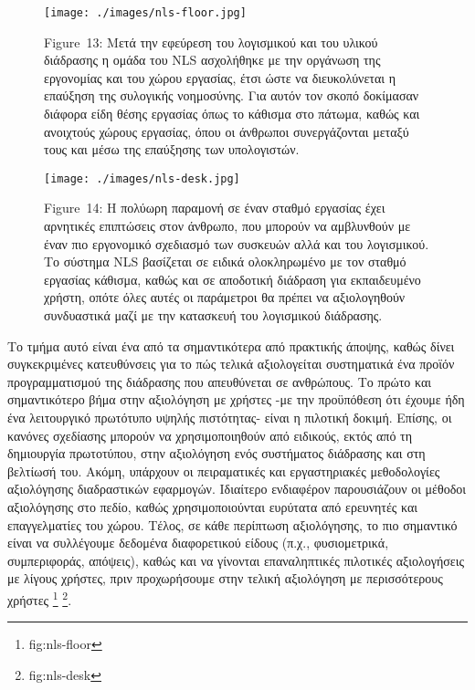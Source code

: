 \documentclass[
]{article}
\begin{document}
\leavevmode{}%
\begin{figure}
\hypertarget{fig:nls-floor}{%
\centering
\texttt{[image: ./images/nls-floor.jpg]}
\caption{Figure~13: Μετά την εφεύρεση του λογισμικού και του υλικού
διάδρασης η ομάδα του NLS ασχολήθηκε με την οργάνωση της εργονομίας και
του χώρου εργασίας, έτσι ώστε να διευκολύνεται η επαύξηση της συλογικής
νοημοσύνης. Για αυτόν τον σκοπό δοκίμασαν διάφορα είδη θέσης εργασίας
όπως το κάθισμα στο πάτωμα, καθώς και ανοιχτούς χώρους εργασίας, όπου οι
άνθρωποι συνεργάζονται μεταξύ τους και μέσω της επαύξησης των
υπολογιστών.}\label{fig:nls-floor}
}
\end{figure}

\leavevmode{}%
\begin{figure}
\hypertarget{fig:nls-desk}{%
\centering
\texttt{[image: ./images/nls-desk.jpg]}
\caption{Figure~14: Η πολύωρη παραμονή σε έναν σταθμό εργασίας έχει
αρνητικές επιπτώσεις στον άνθρωπο, που μπορούν να αμβλυνθούν με έναν πιο
εργονομικό σχεδιασμό των συσκευών αλλά και του λογισμικού. Το σύστημα
NLS βασίζεται σε ειδικά ολοκληρωμένο με τον σταθμό εργασίας κάθισμα,
καθώς και σε αποδοτική διάδραση για εκπαιδευμένο χρήστη, οπότε όλες
αυτές οι παράμετροι θα πρέπει να αξιολογηθούν συνδυαστικά μαζί με την
κατασκευή του λογισμικού διάδρασης.}\label{fig:nls-desk}
}
\end{figure}

Το τμήμα αυτό είναι ένα από τα σημαντικότερα από πρακτικής άποψης, καθώς
δίνει συγκεκριμένες κατευθύνσεις για το πώς τελικά αξιολογείται
συστηματικά ένα προϊόν προγραμματισμού της διάδρασης που απευθύνεται σε
ανθρώπους. Το πρώτο και σημαντικότερο βήμα στην αξιολόγηση με χρήστες
-με την προϋπόθεση ότι έχουμε ήδη ένα λειτουργικό πρωτότυπο υψηλής
πιστότητας- είναι η πιλοτική δοκιμή. Επίσης, οι κανόνες σχεδίασης
μπορούν να χρησιμοποιηθούν από ειδικούς, εκτός από τη δημιουργία
πρωτοτύπου, στην αξιολόγηση ενός συστήματος διάδρασης και στη βελτίωσή
του. Ακόμη, υπάρχουν οι πειραματικές και εργαστηριακές μεθοδολογίες
αξιολόγησης διαδραστικών εφαρμογών. Ιδιαίτερο ενδιαφέρον παρουσιάζουν οι
μέθοδοι αξιολόγησης στο πεδίο, καθώς χρησιμοποιούνται ευρύτατα από
ερευνητές και επαγγελματίες του χώρου. Τέλος, σε κάθε περίπτωση
αξιολόγησης, το πιο σημαντικό είναι να συλλέγουμε δεδομένα διαφορετικού
είδους (π.χ., φυσιομετρικά, συμπεριφοράς, απόψεις), καθώς και να
γίνονται επαναληπτικές πιλοτικές αξιολογήσεις με λίγους χρήστες, πριν
προχωρήσουμε στην τελική αξιολόγηση με περισσότερους χρήστες \footnote{fig:nls-floor}
\footnote{fig:nls-desk}.
\end{document}
